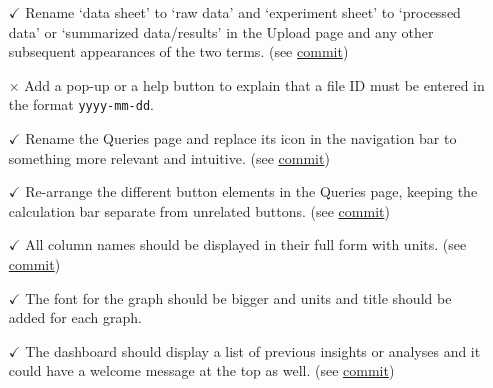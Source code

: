 \documentclass{article}
\begin{document}
\begin{itemize}
    \item[$\checkmark$] Rename `data sheet' to `raw data' and `experiment sheet'
    to `processed data' or `summarized data/results' in the Upload page and any other
    subsequent appearances of the two terms. (see
    \href{https://github.com/SumanyaG/Alkalytics/commit/53ba5521bb378b55e89e74bd13ca00e57eb8eb28}{commit})
    \item[$\times$] Add a pop-up or a help button to explain that a file ID must be
    entered in the format \texttt{yyyy-mm-dd}.
    \item[$\checkmark$] Rename the Queries page and replace its icon in the
    navigation bar to something more relevant and intuitive. (see
    \href{https://github.com/SumanyaG/Alkalytics/commit/d3c98b683118b141b05c5a09b3c770c3c03a897c}{commit})
    \item[$\checkmark$] Re-arrange the different button elements in the Queries
    page, keeping the calculation bar separate from unrelated buttons. (see
    \href{https://github.com/SumanyaG/Alkalytics/commit/8a745c4c77a444c449af95b4ebfeed01ffa6b4b6}{commit})
    \item[$\checkmark$] All column names should be displayed in their full form
    with units. (see
    \href{https://github.com/SumanyaG/Alkalytics/commit/db5000a1cb3ff4bc0b9faedc4bab3176df5a1147}{commit})
    \item[$\checkmark$] The font for the graph should be bigger and units and
    title should be added for each graph.
    \item[$\checkmark$] The dashboard should display a list of previous insights
    or analyses and it could have a welcome message at the top as well. (see
    \href{https://github.com/SumanyaG/Alkalytics/commit/0a362f9e9cbe2f7c2189a084310a3527440535b9}{commit})
\end{itemize}
\end{document}
